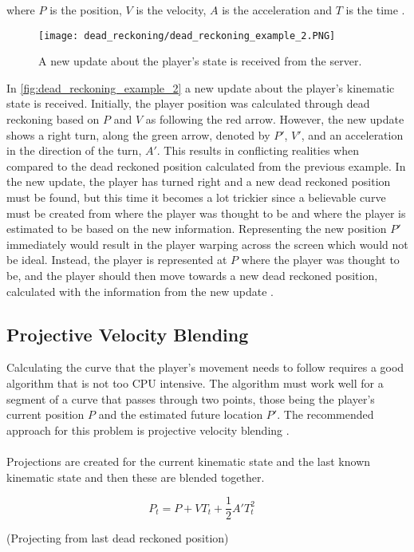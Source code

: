 where $ P $ is the position, $ V $ is the velocity, $ A $ is the acceleration and $T$ is the time \cite{deadreckoning}.
\begin{figure}[H]
    \centering
    \texttt{[image: dead\_reckoning/dead\_reckoning\_example\_2.PNG]}
    \caption{A new update about the player's state is received from the server.}
    \label{fig:dead_reckoning_example_2}
\end{figure}
\noindent
In \autoref{fig:dead_reckoning_example_2} a new update about the player's kinematic state is received.
Initially, the player position was calculated through dead reckoning based on $P$ and $V$ as following the red arrow.
However, the new update shows a right turn, along the green arrow, denoted by $P'$, $V'$, and an acceleration in the direction of the turn, $A'$.
This results in conflicting realities when compared to the dead reckoned position calculated from the previous example.
In the new update, the player has turned right and a new dead reckoned position must be found, but this time it becomes a lot trickier since a believable curve must be created from where the player was thought to be and where the player is estimated to be based on the new information.
Representing the new position $P'$ immediately would result in the player warping across the screen which would not be ideal.
Instead, the player is represented at $ P $ where the player was thought to be, and the player should then move towards a new dead reckoned position, calculated with the information from the new update \cite{deadreckoning}.


\subsection{Projective Velocity Blending}
Calculating the curve that the player's movement needs to follow requires a good algorithm that is not too CPU intensive.
The algorithm must work well for a segment of a curve that passes through two points, those being the player's current position $P$ and the estimated future location $P'$.
The recommended approach for this problem is projective velocity blending \cite{deadreckoning}.
\\\\
Projections are created for the current kinematic state and the last known kinematic state and then these are blended together.

\begin{displaymath}
    P_t = P + VT_t + \frac{1}{2}A'T_t^2 \quad
\end{displaymath}
\begin{center}
    (Projecting from last dead reckoned position)
\end{center}

